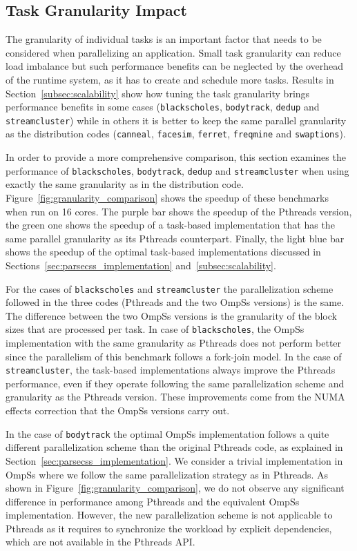 \subsection{Task Granularity Impact}
The granularity of individual tasks is an important factor that needs to be considered when parallelizing an application.
Small task granularity can reduce load imbalance  
but such performance benefits can be neglected by the overhead of the runtime system, as it has to create and schedule more tasks.
Results in Section~\ref{subsec:scalability} show how tuning the task granularity brings performance benefits in some cases (\texttt{blackscholes}, \texttt{bodytrack}, \texttt{dedup} and \texttt{streamcluster})
while in others it is better to keep the same parallel granularity as the \PARSEC{} distribution codes (\texttt{canneal}, \texttt{facesim}, \texttt{ferret}, \texttt{freqmine} and \texttt{swaptions}).
 
In order to provide a more comprehensive comparison, this section examines the performance 
of \texttt{blackscholes}, \texttt{bodytrack}, \texttt{dedup} and \texttt{streamcluster} when using exactly the same granularity as in the \PARSEC{} distribution code.
Figure~\ref{fig:granularity_comparison} shows the speedup of these benchmarks when run on 16 cores. 
The purple bar shows the speedup of the Pthreads version, the green one shows the speedup of a task-based implementation that has the same parallel granularity as its Pthreads counterpart.
Finally, the light blue bar shows the speedup of the optimal task-based implementations discussed in Sections~\ref{sec:parsecss_implementation} and~\ref{subsec:scalability}. 

For the cases of \texttt{blackscholes} and \texttt{streamcluster} the parallelization scheme followed in the three codes (Pthreads and the two OmpSs versions) is the same. 
The difference between the two OmpSs versions is the granularity of the block sizes that are processed per task.
In case of \texttt{blackscholes}, the OmpSs implementation with the same granularity as Pthreads does not perform better since the parallelism of this benchmark follows a fork-join model.
In the case of \texttt{streamcluster}, the task-based implementations always improve the Pthreads performance, even if they operate following the same parallelization scheme and granularity as the Pthreads version.
These improvements come from the NUMA effects correction that the OmpSs versions carry out.

In the case of \texttt{bodytrack} the optimal OmpSs implementation follows a quite different parallelization scheme than the original Pthreads code, as explained in Section~\ref{sec:parsecss_implementation}. 
We consider a trivial implementation in OmpSs where we follow the same parallelization strategy as in Pthreads. 
As shown in Figure~\ref{fig:granularity_comparison}, we do not observe any significant difference in performance among Pthreads and the equivalent OmpSs implementation. 
However, the new parallelization scheme is not applicable to Pthreads as it requires to synchronize the workload by explicit dependencies, which are not available in the Pthreads API.

